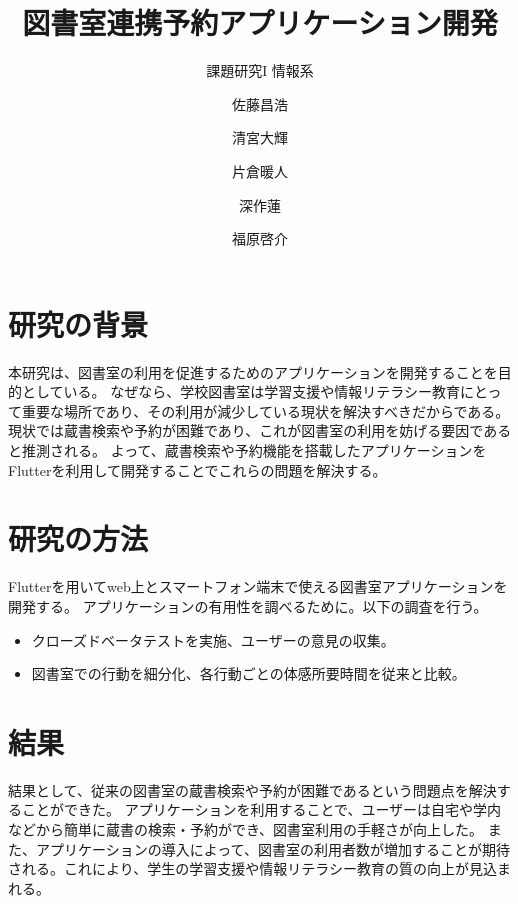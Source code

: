 \documentclass[pdflatex,ja=standard,twocolumn]{bxjsarticle}
\begin{document}
\title{図書室連携予約アプリケーション開発}
\author{課題研究I 情報系\and 佐藤昌浩 \and 清宮大輝 \and 片倉暖人 \and 深作蓮 \and 福原啓介}
\date{\vspace{-10mm}}


\section{研究の背景}
本研究は、図書室の利用を促進するためのアプリケーションを開発することを目的としている。
なぜなら、学校図書室は学習支援や情報リテラシー教育にとって重要な場所であり、その利用が減少している現状を解決すべきだからである。
現状では蔵書検索や予約が困難であり、これが図書室の利用を妨げる要因であると推測される。
よって、蔵書検索や予約機能を搭載したアプリケーションをFlutterを利用して開発することでこれらの問題を解決する。
\section{研究の方法}
Flutterを用いてweb上とスマートフォン端末で使える図書室アプリケーションを開発する。
アプリケーションの有用性を調べるために。以下の調査を行う。
\begin{itemize}
  \item クローズドベータテストを実施、ユーザーの意見の収集。
  \item 図書室での行動を細分化、各行動ごとの体感所要時間を従来と比較。
\end{itemize}
\section{結果}
結果として、従来の図書室の蔵書検索や予約が困難であるという問題点を解決することができた。
アプリケーションを利用することで、ユーザーは自宅や学内などから簡単に蔵書の検索・予約ができ、図書室利用の手軽さが向上した。
また、アプリケーションの導入によって、図書室の利用者数が増加することが期待される。これにより、学生の学習支援や情報リテラシー教育の質の向上が見込まれる。
\end{document}
